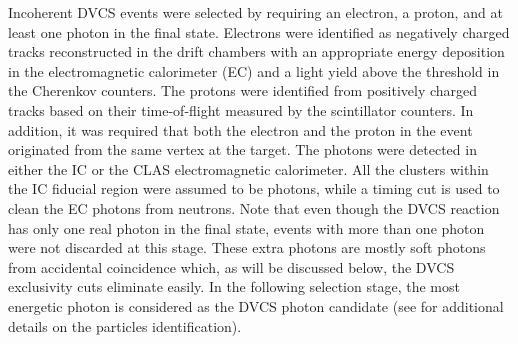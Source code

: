\documentclass[twocolumn,nofootinbib,showpacs,prl,superscriptaddress,secnumarabic,amssymb,nobibnotes,aps,floatfix]{revtex4}
\begin{document}
Incoherent DVCS events were selected by requiring an electron, a proton, and at 
least one photon in the final state. Electrons were identified as negatively 
charged tracks reconstructed in the drift chambers with an appropriate energy 
deposition in the electromagnetic calorimeter (EC) and a light yield above the 
threshold in the Cherenkov counters. The protons were identified from 
positively charged tracks based on their time-of-flight measured 
by the scintillator counters.  In addition, it was required that both the 
electron and the proton in the event originated from the same vertex at the 
target. The photons were detected in either the IC or the CLAS electromagnetic 
calorimeter. All the clusters within the IC fiducial region were assumed to be 
photons, while a timing cut is used to clean the EC photons from neutrons. Note 
that even though the DVCS reaction has only one real photon in the final state, 
events with more than one photon were not discarded at this stage. These extra 
photons are mostly soft photons from accidental coincidence which, as will be 
discussed below, the DVCS exclusivity cuts eliminate easily. In the following 
selection stage, the most energetic photon is considered as the DVCS photon 
candidate (see \cite{Hattawy:thesis} for additional details on the particles 
identification).  
\end{document}
